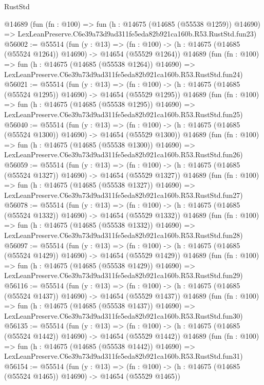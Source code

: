 \begin{lexlean}{RustStd}
\begin{coremodule}
    @14689
    (fun (fn : @100) =>
    fun (h : @14675 (@14685 (@55538 @1259)) @14690) =>
    LexLeanPreserve.C6e39a73d9ad311fe5eda82b921ca160b.R53.RustStd.fun23)
@56002 := @55514
    (fun (y : @13) =>
    (fn : @100) -> (h : @14675 (@14685 (@55524 @1264)) @14690) -> @14654 (@55529 @1264))
    @14689
    (fun (fn : @100) =>
    fun (h : @14675 (@14685 (@55538 @1264)) @14690) =>
    LexLeanPreserve.C6e39a73d9ad311fe5eda82b921ca160b.R53.RustStd.fun24)
@56021 := @55514
    (fun (y : @13) =>
    (fn : @100) -> (h : @14675 (@14685 (@55524 @1295)) @14690) -> @14654 (@55529 @1295))
    @14689
    (fun (fn : @100) =>
    fun (h : @14675 (@14685 (@55538 @1295)) @14690) =>
    LexLeanPreserve.C6e39a73d9ad311fe5eda82b921ca160b.R53.RustStd.fun25)
@56040 := @55514
    (fun (y : @13) =>
    (fn : @100) -> (h : @14675 (@14685 (@55524 @1300)) @14690) -> @14654 (@55529 @1300))
    @14689
    (fun (fn : @100) =>
    fun (h : @14675 (@14685 (@55538 @1300)) @14690) =>
    LexLeanPreserve.C6e39a73d9ad311fe5eda82b921ca160b.R53.RustStd.fun26)
@56059 := @55514
    (fun (y : @13) =>
    (fn : @100) -> (h : @14675 (@14685 (@55524 @1327)) @14690) -> @14654 (@55529 @1327))
    @14689
    (fun (fn : @100) =>
    fun (h : @14675 (@14685 (@55538 @1327)) @14690) =>
    LexLeanPreserve.C6e39a73d9ad311fe5eda82b921ca160b.R53.RustStd.fun27)
@56078 := @55514
    (fun (y : @13) =>
    (fn : @100) -> (h : @14675 (@14685 (@55524 @1332)) @14690) -> @14654 (@55529 @1332))
    @14689
    (fun (fn : @100) =>
    fun (h : @14675 (@14685 (@55538 @1332)) @14690) =>
    LexLeanPreserve.C6e39a73d9ad311fe5eda82b921ca160b.R53.RustStd.fun28)
@56097 := @55514
    (fun (y : @13) =>
    (fn : @100) -> (h : @14675 (@14685 (@55524 @1429)) @14690) -> @14654 (@55529 @1429))
    @14689
    (fun (fn : @100) =>
    fun (h : @14675 (@14685 (@55538 @1429)) @14690) =>
    LexLeanPreserve.C6e39a73d9ad311fe5eda82b921ca160b.R53.RustStd.fun29)
@56116 := @55514
    (fun (y : @13) =>
    (fn : @100) -> (h : @14675 (@14685 (@55524 @1437)) @14690) -> @14654 (@55529 @1437))
    @14689
    (fun (fn : @100) =>
    fun (h : @14675 (@14685 (@55538 @1437)) @14690) =>
    LexLeanPreserve.C6e39a73d9ad311fe5eda82b921ca160b.R53.RustStd.fun30)
@56135 := @55514
    (fun (y : @13) =>
    (fn : @100) -> (h : @14675 (@14685 (@55524 @1442)) @14690) -> @14654 (@55529 @1442))
    @14689
    (fun (fn : @100) =>
    fun (h : @14675 (@14685 (@55538 @1442)) @14690) =>
    LexLeanPreserve.C6e39a73d9ad311fe5eda82b921ca160b.R53.RustStd.fun31)
@56154 := @55514
    (fun (y : @13) =>
    (fn : @100) -> (h : @14675 (@14685 (@55524 @1465)) @14690) -> @14654 (@55529 @1465))

\end{coremodule}
\end{lexlean}
